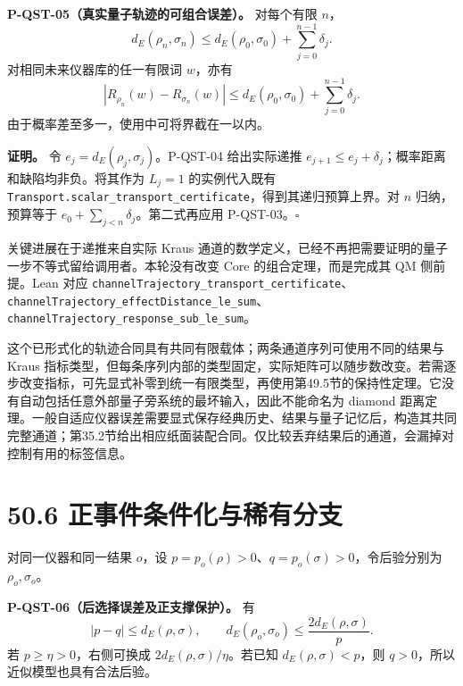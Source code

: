 \documentclass[
  11pt,
  oneside]{book}
\begin{document}
\protect\hypertarget{p-qst-05}{}{}

\textbf{P-QST-05（真实量子轨迹的可组合误差）。} 对每个有限 \(n\)， \[
d_E(\rho_n,\sigma_n)
\le d_E(\rho_0,\sigma_0)+\sum_{j=0}^{n-1}\delta_j.
\] 对相同未来仪器库的任一有限词 \(w\)，亦有 \[
|R_{\rho_n}(w)-R_{\sigma_n}(w)|
\le d_E(\rho_0,\sigma_0)+\sum_{j=0}^{n-1}\delta_j.
\] 由于概率差至多一，使用中可将界截在一以内。

\textbf{证明。} 令 \(e_j=d_E(\rho_j,\sigma_j)\)。P-QST-04 给出实际递推
\(e_{j+1}\le e_j+\delta_j\)；概率距离和缺陷均非负。将其作为 \(L_j=1\)
的实例代入既有
\texttt{Transport.scalar\_\allowbreak transport\_\allowbreak certificate}，得到其递归预算上界。对
\(n\) 归纳，预算等于 \(e_0+\sum_{j<n}\delta_j\)。第二式再应用
P-QST-03。\(\square\)

关键进展在于递推来自实际 Kraus
通道的数学定义，已经不再把需要证明的量子一步不等式留给调用者。本轮没有改变
Core 的组合定理，而是完成其 QM 侧前提。Lean 对应
\texttt{channelTrajectory\_\allowbreak transport\_\allowbreak certificate}、\allowbreak \texttt{channelTrajectory\_\allowbreak effectDistance\_\allowbreak le\_\allowbreak sum}、\allowbreak \texttt{channelTrajectory\_\allowbreak response\_\allowbreak sub\_\allowbreak le\_\allowbreak sum}。

这个已形式化的轨迹合同具有共同有限载体；两条通道序列可使用不同的结果与
Kraus
指标类型，但每条序列内部的类型固定，实际矩阵可以随步数改变。若需逐步改变指标，可先显式补零到统一有限类型，再使用第49.5节的保持性定理。它没有自动包括任意外部量子旁系统的最坏输入，因此不能命名为
diamond
距离定理。一般自适应仪器误差需要显式保存经典历史、结果与量子记忆后，构造其共同完整通道；第35.2节给出相应纸面装配合同。仅比较丢弃结果后的通道，会漏掉对控制有用的标签信息。

\hypertarget{ux6b63ux4e8bux4ef6ux6761ux4ef6ux5316ux4e0eux7a00ux6709ux5206ux652f}{%
\section{50.6
正事件条件化与稀有分支}\label{ux6b63ux4e8bux4ef6ux6761ux4ef6ux5316ux4e0eux7a00ux6709ux5206ux652f}}

对同一仪器和同一结果 \(o\)，设
\(p=p_o(\rho)>0\)、\(q=p_o(\sigma)>0\)，令后验分别为
\(\rho_o,\sigma_o\)。

\protect\hypertarget{p-qst-06}{}{}

\textbf{P-QST-06（后选择误差及正支撑保护）。} 有 \[
|p-q|\le d_E(\rho,\sigma),\qquad
d_E(\rho_o,\sigma_o)\le \frac{2d_E(\rho,\sigma)}{p}.
\] 若 \(p\ge\eta>0\)，右侧可换成 \(2d_E(\rho,\sigma)/\eta\)。若已知
\(d_E(\rho,\sigma)<p\)，则 \(q>0\)，所以近似模型也具有合法后验。
\end{document}
